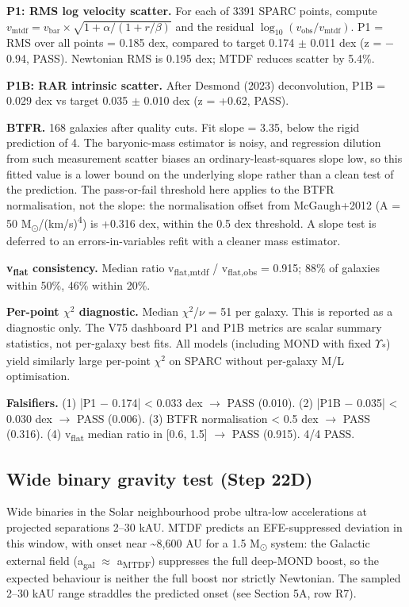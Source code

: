 \documentclass[11pt,a4paper]{article}
\begin{document}
\textbf{P1: RMS log velocity scatter.} For each of 3391 SPARC points, compute \(v_{\mathrm{mtdf}} = v_{\mathrm{bar}} \times \sqrt{1 + \alpha/(1 + r/\beta)}\) and the residual \(\log_{10}(v_{\mathrm{obs}}/v_{\mathrm{mtdf}})\). P1 = RMS over all points = 0.185 dex, compared to target 0.174 $\pm$ 0.011 dex (z = $-$0.94, PASS). Newtonian RMS is 0.195 dex; MTDF reduces scatter by 5.4\%.

\textbf{P1B: RAR intrinsic scatter.} After Desmond (2023) deconvolution, P1B = 0.029 dex vs target 0.035 $\pm$ 0.010 dex (z = +0.62, PASS).

\textbf{BTFR.} 168 galaxies after quality cuts. Fit slope = 3.35, below the rigid prediction of 4. The baryonic-mass estimator is noisy, and regression dilution from such measurement scatter biases an ordinary-least-squares slope low, so this fitted value is a lower bound on the underlying slope rather than a clean test of the prediction. The pass-or-fail threshold here applies to the BTFR normalisation, not the slope: the normalisation offset from McGaugh+2012 (A = 50 M\textsubscript{$\odot$}/(km/\allowbreak{}s)\textsuperscript{4}) is +0.316 dex, within the 0.5 dex threshold. A slope test is deferred to an errors-in-variables refit with a cleaner mass estimator.

\textbf{v\textsubscript{flat} consistency.} Median ratio v\textsubscript{flat,mtdf} / v\textsubscript{flat,obs} = 0.915; 88\% of galaxies within 50\%, 46\% within 20\%.

\textbf{Per-point $\chi$$^{2}$ diagnostic.} Median $\chi$$^{2}$/$\nu$ = 51 per galaxy. This is reported as a diagnostic only. The V75 dashboard P1 and P1B metrics are scalar summary statistics, not per-galaxy best fits. All models (including MOND with fixed $\Upsilon$\textsubscript{*}) yield similarly large per-point $\chi$$^{2}$ on SPARC without per-galaxy M/\allowbreak{}L optimisation.

\textbf{Falsifiers.} (1) |P1 $-$ 0.174| < 0.033 dex $\rightarrow$ PASS (0.010). (2) |P1B $-$ 0.035| < 0.030 dex $\rightarrow$ PASS (0.006). (3) BTFR normalisation < 0.5 dex $\rightarrow$ PASS (0.316). (4) v\textsubscript{flat} median ratio in [0.6, 1.5] $\rightarrow$ PASS (0.915). 4/\allowbreak{}4 PASS.

\subsection{Wide binary gravity test (Step 22D)}
Wide binaries in the Solar neighbourhood probe ultra-low accelerations at projected separations 2--30 kAU. MTDF predicts an EFE-suppressed deviation in this window, with onset near \~{}8,600 AU for a 1.5 M\textsubscript{$\odot$} system: the Galactic external field (a\textsubscript{gal} $\approx$ a\textsubscript{MTDF}) suppresses the full deep-MOND boost, so the expected behaviour is neither the full boost nor strictly Newtonian. The sampled 2--30 kAU range straddles the predicted onset (see Section 5A, row R7).
\end{document}
